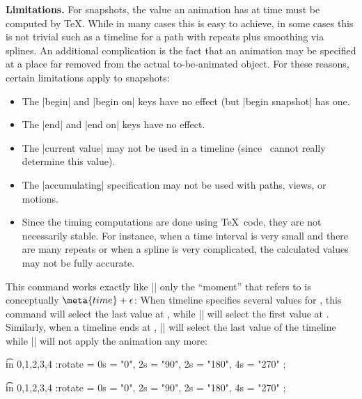 \begin{command}{\pgfsnapshot{}}
    \medskip\textbf{Limitations.}
    For snapshots, the value an animation has at time  must be
    computed by \TeX. While in many cases this is easy to achieve, in some
    cases this is not trivial such as a timeline for a path with repeats plus
    smoothing via splines. An additional complication is the fact that an
    animation may be specified at a place far removed from the actual
    to-be-animated object. For these reasons, certain limitations apply to
    snapshots:
    \begin{itemize}
        \item The |begin| and |begin on| keys have no effect (but |begin
            snapshot| has one.
        \item The |end| and |end on| keys have no effect.
        \item The |current value| may not be used in a timeline (since
            \pgfname\ cannot really determine this value).
        \item The |accumulating| specification may not be used with paths,
            views, or motions.
        \item Since the timing computations are done using \TeX\ code, they are
            not necessarily stable. For instance, when a time interval is very
            small and there are many repeats or when a spline is very
            complicated, the calculated values may not be fully accurate.
    \end{itemize}
\end{command}

\begin{command}{\pgfsnapshotafter{}}
    This command works exactly like |\pgfsnapshot| only the ``moment'' that
     refers to is conceptually $\meta{time} + \epsilon$: When
    timeline specifies several values for , this command will select
    the last value at , while |\pgfsnapshot| will select the first
    value at . Similarly, when a timeline ends at ,
    |\pgfsnapshot| will select the last value of the timeline while
    |\pgfsnapshotafter| will not apply the animation any more:
\begin{codeexample}[]
\foreach \t in {0,1,2,3,4} {
  \pgfsnapshot{\t}
  \tikz :rotate = { 0s = "0", 2s = "90", 2s = "180", 4s = "270" }
    ; }
\end{codeexample}
\begin{codeexample}[]
\foreach \t in {0,1,2,3,4} {
  \pgfsnapshotafter{\t}
  \tikz :rotate = { 0s = "0", 2s = "90", 2s = "180", 4s = "270" }
    ; }
\end{codeexample}
\end{command}


